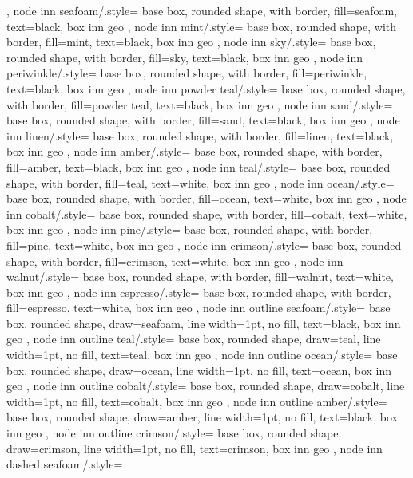 {{	},
	node inn seafoam/.style={
		base box, rounded shape, with border,
		fill=seafoam, text=black, box inn geo
	},
	node inn mint/.style={
		base box, rounded shape, with border,
		fill=mint, text=black, box inn geo
	},
	node inn sky/.style={
		base box, rounded shape, with border,
		fill=sky, text=black, box inn geo
	},
	node inn periwinkle/.style={
		base box, rounded shape, with border,
		fill=periwinkle, text=black, box inn geo
	},
	node inn powder teal/.style={
		base box, rounded shape, with border,
		fill=powder teal, text=black, box inn geo
	},
	node inn sand/.style={
		base box, rounded shape, with border,
		fill=sand, text=black, box inn geo
	},
	node inn linen/.style={
		base box, rounded shape, with border,
		fill=linen, text=black, box inn geo
	},
	node inn amber/.style={
		base box, rounded shape, with border,
		fill=amber, text=black, box inn geo
	},
	node inn teal/.style={
		base box, rounded shape, with border,
		fill=teal, text=white, box inn geo
	},
	node inn ocean/.style={
		base box, rounded shape, with border,
		fill=ocean, text=white, box inn geo
	},
	node inn cobalt/.style={
		base box, rounded shape, with border,
		fill=cobalt, text=white, box inn geo
	},
	node inn pine/.style={
		base box, rounded shape, with border,
		fill=pine, text=white, box inn geo
	},
	node inn crimson/.style={
		base box, rounded shape, with border,
		fill=crimson, text=white, box inn geo
	},
	node inn walnut/.style={
		base box, rounded shape, with border,
		fill=walnut, text=white, box inn geo
	},
	node inn espresso/.style={
		base box, rounded shape, with border,
		fill=espresso, text=white, box inn geo
	},
	node inn outline seafoam/.style={
		base box, rounded shape,
		draw=seafoam, line width=1pt,
		no fill, text=black, box inn geo
	},
	node inn outline teal/.style={
		base box, rounded shape,
		draw=teal, line width=1pt,
		no fill, text=teal, box inn geo
	},
	node inn outline ocean/.style={
		base box, rounded shape,
		draw=ocean, line width=1pt,
		no fill, text=ocean, box inn geo
	},
	node inn outline cobalt/.style={
		base box, rounded shape,
		draw=cobalt, line width=1pt,
		no fill, text=cobalt, box inn geo
	},
	node inn outline amber/.style={
		base box, rounded shape,
		draw=amber, line width=1pt,
		no fill, text=black, box inn geo
	},
	node inn outline crimson/.style={
		base box, rounded shape,
		draw=crimson, line width=1pt,
		no fill, text=crimson, box inn geo
	},
	node inn dashed seafoam/.style={
}}
